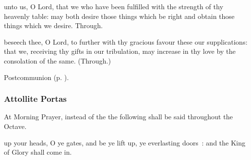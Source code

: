 
\postcommunion
{} unto us, O Lord, that we who have been fulfilled with the strength of thy heavenly table: may both desire those things which be right and obtain those things which we desire. Through.

 beseech thee, O Lord, to further with thy gracious favour these our supplications: that we, receiving thy gifts in our tribulation, may increase in thy love by the consolation of the same. (Through.)

\begin{rubric}
	 Postcommunion  (p. \pageref{SPMaryInEaster}).
\end{rubric}

\clearpage
{}


\subsubsection{Attollite Portas}\label{attolite}
\begin{rubric}
    At Morning Prayer, instead of the  the following shall be said throughout the Octave.
\end{rubric}
 up your heads, O ye gates, and be ye lift up, ye everlasting doors~: and the King of Glory shall come in.



